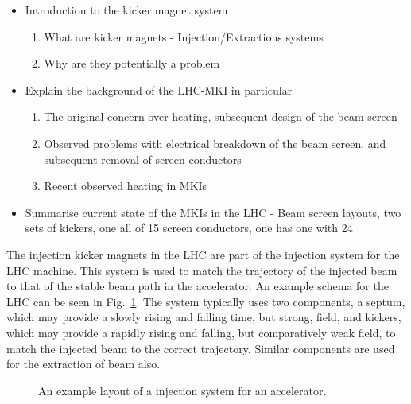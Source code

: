 
\begin{itemize}
\item{Introduction to the kicker magnet system}
\begin{enumerate}
\item{What are kicker magnets - Injection/Extractions systems}
\item{Why are they potentially a problem}
\end{enumerate}
\item{Explain the background of the LHC-MKI in particular}
\begin{enumerate}
\item{The original concern over heating, subsequent design of the beam screen}
\item{Observed problems with electrical breakdown of the beam screen, and subsequent removal of screen conductors}
\item{Recent observed heating in MKIs}
\end{enumerate}
\item{Summarise current state of the MKIs in the LHC - Beam screen layouts, two sets of kickers, one all of 15 screen conductors, one has one with 24}
\end{itemize}

The injection kicker magnets in the LHC are part of the injection system for the LHC machine. This system is used to match the trajectory of the injected beam to that of the stable beam path in the accelerator. An example schema for the LHC can be seen in Fig.~\ref{fig:injection-system-schema}. The system typically uses two components, a septum, which may provide a slowly rising and falling time, but strong, field, and kickers, which may provide a rapidly rising and falling, but comparatively weak field, to match the injected beam to the correct trajectory. Similar components are used for the extraction of beam also.

\begin{figure}

\label{fig:injection-system-schema}
\caption{An example layout of a injection system for an accelerator.}
\end{figure}